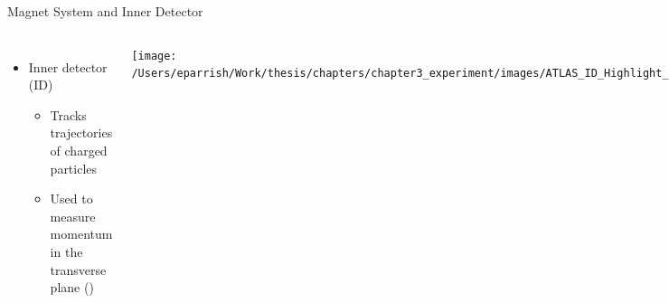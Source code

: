 \documentclass[aspectratio=169,xcolor=table]{beamer}
\begin{document}
\begin{frame}[t]{Magnet System and Inner Detector}
\begin{columns}[t]
        \begin{itemize}
          \item Inner detector (ID) 
          \begin{itemize}
              \item Tracks trajectories of charged particles
              \item Used to measure momentum in the transverse plane (\pt)
          \end{itemize}
        \end{itemize}
        \begin{columns}
              \texttt{[image: /Users/eparrish/Work/thesis/chapters/chapter3\_experiment/images/ATLAS\_ID\_Highlight\_Run2]}
        \centering

          \texttt{[image: /Users/eparrish/Work/thesis/chapters/chapter3\_experiment/images/ATLAS\_ID\_Run2]}
        \end{columns}
      \end{columns}
    \end{frame}
\end{document}
